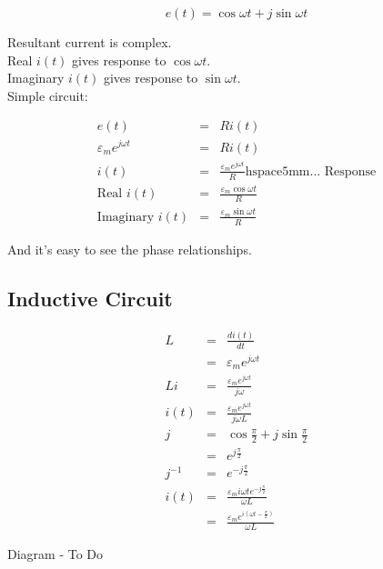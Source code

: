 \documentclass[a4paper,12pt]{article}
\begin{document}
\[ e(t) = \cos{\omega t} + j \sin{\omega t} \]

Resultant current is complex. \\

Real $i(t)$ gives response to $\cos{\omega t}$. \\

Imaginary $i(t)$ gives response to $\sin{\omega t}$. \\

Simple circuit:

\begin{eqnarray*}
e(t) & = & R i(t) \\
\varepsilon_{m} e^{j \omega t} & = & R i(t) \\
i(t) & = & \frac{\varepsilon_{m} e^{j \omega t}}{R} \mbox{hspace{5mm}
... Response} \\
\mbox{Real } i(t) & = & \frac{\varepsilon_{m} \cos{\omega t}}{R} \\
\mbox{Imaginary } i(t) & = & \frac{\varepsilon_{m} \sin{\omega t}}{R}
\end{eqnarray*}


And it's easy to see the phase relationships.

\subsection{Inductive Circuit}

\begin{eqnarray*}
		L & = & \frac{di(t)}{dt} \\
  		  & = & \varepsilon_{m} e^{j \omega t} \\
Li		  & = & \frac{\varepsilon_{m} e^{j \omega t}}{j \omega} \\
i(t)	  & = & \frac{\varepsilon_{m} e^{j \omega t}}{j \omega L} \\
j		  & = & \cos{\frac{\pi}{2}} + j \sin{\frac{\pi}{2}} \\
		  & = & e^{j \frac{\pi}{2}} \\
j^{-1}  & = & e^{-j \frac{\pi}{2}} \\
i(t)	  & = & \frac{\varepsilon_{m} i \omega t e^{- j
\frac{\pi}{2}}}{\omega L} \\
		  & = & \frac{\varepsilon_{m} e^{i\left(\omega t -
		  \frac{\pi}{2}\right)}}{\omega L}
\end{eqnarray*}

\begin{table}[hbtp]

Diagram - To Do

\end{table}
\end{document}
